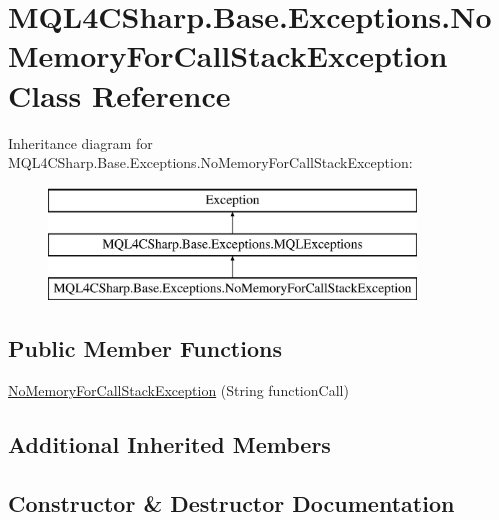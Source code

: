 \hypertarget{class_m_q_l4_c_sharp_1_1_base_1_1_exceptions_1_1_no_memory_for_call_stack_exception}{}\section{M\+Q\+L4\+C\+Sharp.\+Base.\+Exceptions.\+No\+Memory\+For\+Call\+Stack\+Exception Class Reference}
\label{class_m_q_l4_c_sharp_1_1_base_1_1_exceptions_1_1_no_memory_for_call_stack_exception}
Inheritance diagram for M\+Q\+L4\+C\+Sharp.\+Base.\+Exceptions.\+No\+Memory\+For\+Call\+Stack\+Exception\+:\begin{figure}[H]
\begin{center}
\leavevmode
\includegraphics[height=3.000000cm]{class_m_q_l4_c_sharp_1_1_base_1_1_exceptions_1_1_no_memory_for_call_stack_exception}
\end{center}
\end{figure}
\subsection*{Public Member Functions}
\begin{DoxyCompactItemize}
\item 
\hyperlink{class_m_q_l4_c_sharp_1_1_base_1_1_exceptions_1_1_no_memory_for_call_stack_exception_ab21a4398cd5bcd2b10f8a0580ad53e2b}{No\+Memory\+For\+Call\+Stack\+Exception} (String function\+Call)
\end{DoxyCompactItemize}
\subsection*{Additional Inherited Members}


\subsection{Constructor \& Destructor Documentation}
